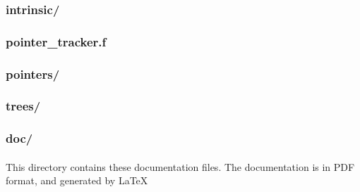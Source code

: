 \documentclass{article}
\begin{document}
\subsubsection{intrinsic/}
\label{sec:dirintrinsic}
\paragraph{}

\subsubsection{pointer\_tracker.f}
\paragraph{}

\subsubsection{pointers/}
\label{sec:dirpointers}

\subsubsection{trees/}
\label{sec:dirtrees}

\subsubsection{doc/}
\paragraph{}
This directory contains these documentation files. The documentation is in PDF format, and generated by \LaTeX


\end{document}
